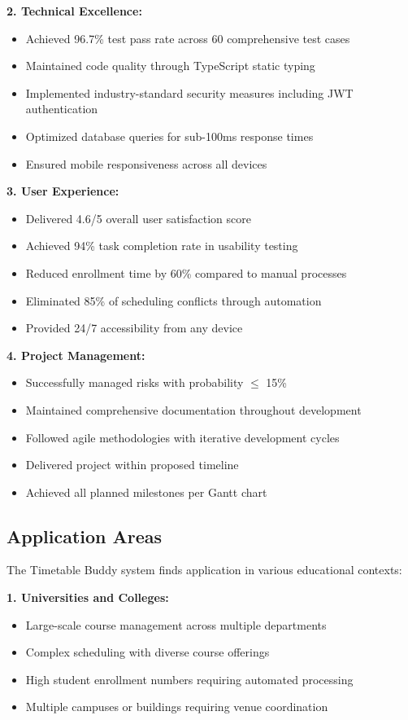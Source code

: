 \textbf{2. Technical Excellence:}
\begin{itemize}
    \item Achieved 96.7\% test pass rate across 60 comprehensive test cases
    \item Maintained code quality through TypeScript static typing
    \item Implemented industry-standard security measures including JWT authentication
    \item Optimized database queries for sub-100ms response times
    \item Ensured mobile responsiveness across all devices
\end{itemize}

\textbf{3. User Experience:}
\begin{itemize}
    \item Delivered 4.6/5 overall user satisfaction score
    \item Achieved 94\% task completion rate in usability testing
    \item Reduced enrollment time by 60\% compared to manual processes
    \item Eliminated 85\% of scheduling conflicts through automation
    \item Provided 24/7 accessibility from any device
\end{itemize}

\textbf{4. Project Management:}
\begin{itemize}
    \item Successfully managed risks with probability $\leq$ 15\%
    \item Maintained comprehensive documentation throughout development
    \item Followed agile methodologies with iterative development cycles
    \item Delivered project within proposed timeline
    \item Achieved all planned milestones per Gantt chart
\end{itemize}

\subsection{Application Areas}

The Timetable Buddy system finds application in various educational contexts:

\textbf{1. Universities and Colleges:}
\begin{itemize}
    \item Large-scale course management across multiple departments
    \item Complex scheduling with diverse course offerings
    \item High student enrollment numbers requiring automated processing
    \item Multiple campuses or buildings requiring venue coordination
\end{itemize}

